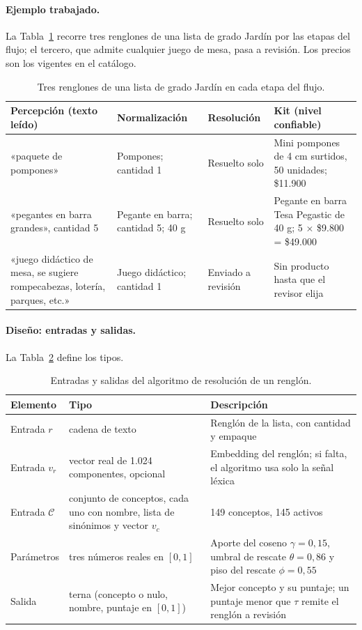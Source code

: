 \paragraph{Ejemplo trabajado.} La Tabla~\ref{tab:ejemplo-trabajado} recorre tres renglones de una lista de grado Jardín por las etapas del flujo; el tercero, que admite cualquier juego de mesa, pasa a revisión. Los precios son los vigentes en el catálogo.

\begin{table}[!htb]
\centering\footnotesize
\caption{Tres renglones de una lista de grado Jardín en cada etapa del flujo.}
\label{tab:ejemplo-trabajado}
\begin{tabularx}{\textwidth}{@{}p{2.7cm}p{2.7cm}p{2.7cm}X@{}}
\toprule
Percepción (texto leído) & Normalización & Resolución & Kit (nivel confiable) \\
\midrule
«paquete de pompones» & Pompones; cantidad 1 & Resuelto solo & Mini pompones de 4 cm surtidos, 50 unidades; \$11.900 \\
«pegantes en barra grandes», cantidad 5 & Pegante en barra; cantidad 5; 40 g & Resuelto solo & Pegante en barra Tesa Pegastic de 40 g; 5 $\times$ \$9.800 = \$49.000 \\
«juego didáctico de mesa, se sugiere rompecabezas, lotería, parques, etc.» & Juego didáctico; cantidad 1 & Enviado a revisión & Sin producto hasta que el revisor elija \\
\bottomrule
\end{tabularx}
\end{table}

\paragraph{Diseño: entradas y salidas.} La Tabla~\ref{tab:es-resolucion} define los tipos.

\begin{table}[!htb]
\centering\footnotesize
\caption{Entradas y salidas del algoritmo de resolución de un renglón.}
\label{tab:es-resolucion}
\begin{tabularx}{\textwidth}{@{}p{2.6cm}p{3.6cm}X@{}}
\toprule
Elemento & Tipo & Descripción \\
\midrule
Entrada $r$ & cadena de texto & Renglón de la lista, con cantidad y empaque \\
Entrada $v_r$ & vector real de 1.024 componentes, opcional & Embedding del renglón; si falta, el algoritmo usa solo la señal léxica \\
Entrada $\mathcal{C}$ & conjunto de conceptos, cada uno con nombre, lista de sinónimos y vector $v_c$ & 149 conceptos, 145 activos \\
Parámetros & tres números reales en $[0,1]$ & Aporte del coseno $\gamma=0{,}15$, umbral de rescate $\theta=0{,}86$ y piso del rescate $\phi=0{,}55$ \\
Salida & terna (concepto o nulo, nombre, puntaje en $[0,1]$) & Mejor concepto y su puntaje; un puntaje menor que $\tau$ remite el renglón a revisión \\
\bottomrule
\end{tabularx}
\end{table}


